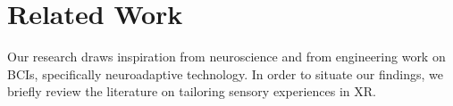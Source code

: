 \section{Related Work}
Our research draws inspiration from neuroscience and from engineering work on BCIs, specifically neuroadaptive technology. In order to situate our findings, we briefly review the literature on tailoring sensory experiences in XR.